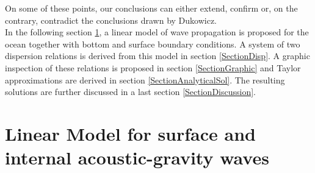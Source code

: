 \documentclass[a4paper,11pt]{article}
\begin{document}
On some of these points, our conclusions can either extend, confirm or, on the contrary, contradict the conclusions drawn by Dukowicz.\\
In the following section \ref{SectionLinModels}, a linear model of wave propagation is proposed for the ocean together with bottom and surface boundary conditions. A system of two dispersion relations is derived from this model in section \ref{SectionDisp}. A graphic inspection of these relations is proposed in section \ref{SectionGraphic} and Taylor approximations are derived in section \ref{SectionAnalyticalSol}. The resulting solutions are further discussed in a last section \ref{SectionDiscussion}.


\newpage
\section{Linear Model for surface and internal acoustic-gravity waves}
\label{SectionLinModels}
\end{document}
